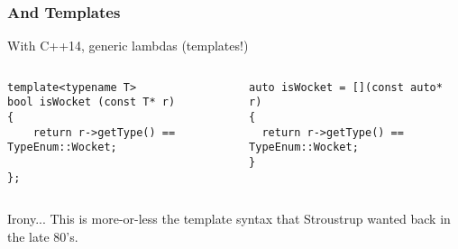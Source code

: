 \begin{frame}[fragile,t]
\frametitle{And Templates}
With C++14, generic lambdas (templates!)
\begin{columns}[t]
{\scriptsize\begin{verbatim}
template<typename T>
bool isWocket (const T* r)
{
    return r->getType() == TypeEnum::Wocket;

};
\end{verbatim}
}
\pause{}
{\scriptsize\begin{verbatim}
auto isWocket = [](const auto* r)
{  
  return r->getType() == TypeEnum::Wocket;
}
\end{verbatim}
}
\end{columns}

\vskip 12pt
\pause{}
\begin{block}{Irony...}
This is more-or-less the template syntax that Stroustrup wanted back
in the late 80's.
\end{block}

\end{frame}
